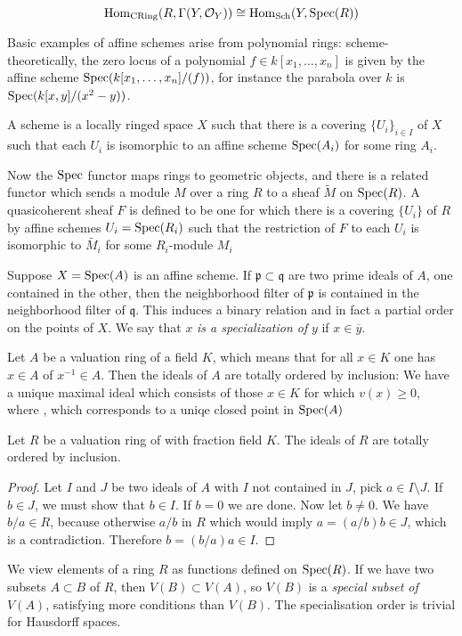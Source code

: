 \[
	\operatorname{Hom}_{\text{CRing}}(R, \Gamma(Y,\mathcal{O}_Y)) \cong \operatorname{Hom}_{\text{Sch}}(Y, \operatorname{Spec}(R))
\]

Basic examples of affine schemes arise from polynomial rings: scheme-theoretically, the zero locus of a polynomial $f \in k[x_1, \dots, x_n]$ is given by the affine scheme $\operatorname{Spec}(k[x_1, \dots, x_n]/(f))$, for instance the parabola over $k$ is $\operatorname{Spec}(k[x,y]/(x^2-y))$.

\begin{definition}
	A scheme is a locally ringed space $X$ such that there is a covering $\{U_i\}_{i \in I}$ of $X$ such that each $U_i$ is isomorphic to an affine scheme $\operatorname{Spec}(A_i)$ for some ring $A_i$.
\end{definition}

Now the $\operatorname{Spec}$ functor maps rings to geometric objects, and there is a related functor which sends a module $M$ over a ring $R$ to a sheaf $\widetilde{M}$ on $\operatorname{Spec}(R)$. A quasicoherent sheaf $F$ is defined to be one for which there is a covering $\{U_i\}$ of $R$ by affine schemes $U_i = \operatorname{Spec}(R_i)$ such that the restriction of $F$ to each $U_i$ is isomorphic to $\widetilde{M_i}$ for some $R_i$-module $M_i$

Suppose $X = \operatorname{Spec}(A)$ is an affine scheme. If $\mathfrak{p} \subset \mathfrak{q}$ are two prime ideals of $A$, one contained in the other, then the neighborhood filter of $\mathfrak{p}$ is contained in the neighborhood filter of $\mathfrak{q}$. This induces a binary relation and in fact a partial order on the points of $X$. We say that $x$ \textit{is a specialization of} $y$ if $x \in \overline{y}$.

\begin{example}
	Let $A$ be a valuation ring of a field $K$, which means that for all $x \in K$ one has $x \in A$ of $x^{-1} \in A$. Then the ideals of $A$ are totally ordered by inclusion: We have a unique maximal ideal which consists of those $x \in K$ for which $v(x) \ge 0$, where , which corresponds to a uniqe closed point in $\operatorname{Spec}(A)$

	\begin{lemma}
		Let $R$ be a valuation ring of with fraction field $K$. The ideals of $R$ are totally ordered by inclusion.
	\end{lemma}

	\begin{proof}
		Let $I$ and $J$ be two ideals of $A$ with $I$ not contained in $J$, pick $a \in I \setminus J$. If $b \in J$, we must show that $b \in I$. If $b = 0$ we are done. Now let $b \neq 0$. We have $b/a \in R$, because otherwise $a/b$ in $R$ which would imply $a = (a/b)b \in J$, which is a contradiction. Therefore $b = (b/a)a \in I$.
	\end{proof}
\end{example}

We view elements of a ring $R$ as functions defined on $\operatorname{Spec}(R)$. If we have two subsets $A \subset B$ of $R$, then $V(B) \subset V(A)$, so $V(B)$ is a \textit{special subset of $V(A)$}, satisfying more conditions than $V(B)$. The specialisation order is trivial for Hausdorff spaces.
